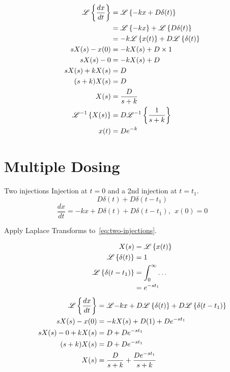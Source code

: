 \documentclass[
	date={September 11{,} 2024}
]{math486notes}
\begin{document}
\begin{equation*}
\begin{aligned}
	\laplace[\frac{dx}{dt}] &= \laplace[ -kx + D\delta(t) ]\\
							&= \laplace[-kx] + \laplace[D\delta(t)]\\
							&= -k\laplace[x(t)] + D\laplace[\delta(t)]\\
	sX(s) - x(0) &= -kX(s) + D\times1\\
	sX(s) - 0 &= -kX(s) + D\\
	sX(s) + kX(s) &= D\\
	(s+k)X(s) &= D\\
	X(s) &= \frac{D}{s+k}\\
	\laplacei[X(s)] &= D\laplacei[\frac{1}{s+k}]\\
	x(t) &= De^{-k}\\
\end{aligned}
\end{equation*}

\section{Multiple Dosing}\label{sec:multiple-dosing}
Two injections
Injection at $t=0$ and a 2nd injection at $t=t_{1}$.
\[ D\delta(t) + D\delta(t - t_{1}) \]
\begin{equation}
	\frac{dx}{dt} = -kx + D\delta(t) + D\delta(t - t_{1}),\ \ x(0) = 0
	\label{eq:two-injections}
\end{equation}

Apply Laplace Transforms to~\eqref{eq:two-injections}.

\begin{equation*}
\begin{aligned}
	X(s) &= \laplace[x(t)]\\
	\laplace[\delta(t)] &= 1\\
	\laplace[ \delta(t - t_{1}) ] &= \int_{0}^{\infty} \dots\\
		&= e^{-st_{1}}
\end{aligned}
\end{equation*}
\begin{equation*}
\begin{aligned}
	\laplace[\frac{dx}{dt}] &= \laplace{-kx} + D\laplace[\delta(t)] + D\laplace[\delta(t-t_{1})]\\
	sX(s) - x(0) &= -kX(s) + D(1) + De^{-st_{1}}\\
	sX(s) - 0 + kX(s) &= D + De^{-st_{1}}\\
	(s+k)X(s) &= D + De^{-st_{1}}\\
	X(s) &= \frac{D}{s+k} + \frac{De^{-st_{1}}}{s+k}\\
\end{aligned}
\end{equation*}
\end{document}
